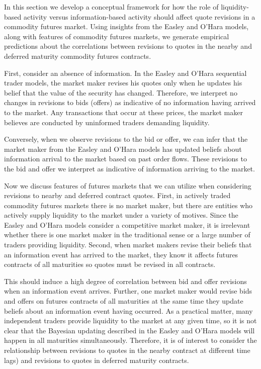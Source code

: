 \documentclass[review,12pt]{elsarticle}
\begin{document}
\begin{linenumbers}
In this section we develop a conceptual framework for how the role of
liquidity-based activity versus information-based activity should affect
quote revisions in a commodity futures market. Using insights from the
Easley and O'Hara models, along with features of commodity futures
markets, we generate empirical predictions about the correlations
between revisions to quotes in the nearby and deferred maturity
commodity futures contracts.

First, consider an absence of information. In the Easley and O'Hara
sequential trader models, the market maker revises his quotes only when
he updates his belief that the value of the security has changed.
Therefore, we interpret no changes in revisions to bids (offers) as
indicative of no information having arrived to the market. Any
transactions that occur at these prices, the market maker believes are
conducted by uninformed traders demanding liquidity.

Conversely, when we observe revisions to the bid or offer, we can infer
that the market maker from the Easley and O'Hara models has updated
beliefs about information arrival to the market based on past order
flows. These revisions to the bid and offer we interpret as indicative
of information arriving to the market.

Now we discuss features of futures markets that we can utilize when
considering revisions to nearby and deferred contract quotes. First, in
actively traded commodity futures markets there is no market maker, but
there are entities who actively supply liquidity to the market under a
variety of motives. Since the Easley and O'Hara models consider a
competitive market maker, it is irrelevant whether there is one market
maker in the traditional sense or a large number of traders providing
liquidity. Second, when market makers revise their beliefs that an
information event has arrived to the market, they know it affects
futures contracts of all maturities so quotes must be revised in all
contracts.

This should induce a high degree of correlation between bid and offer
revisions when an information event arrives. Further, one market maker
would revise bids and offers on futures contracts of all maturities at
the same time they update beliefs about an information event having
occurred. As a practical matter, many independent traders provide
liquidity to the market at any given time, so it is not clear that the
Bayesian updating described in the Easley and O'Hara models will happen
in all maturities simultaneously. Therefore, it is of interest to
consider the relationship between revisions to quotes in the nearby
contract at different time lags) and revisions to quotes in deferred
maturity contracts.


\end{linenumbers}
\end{document}
